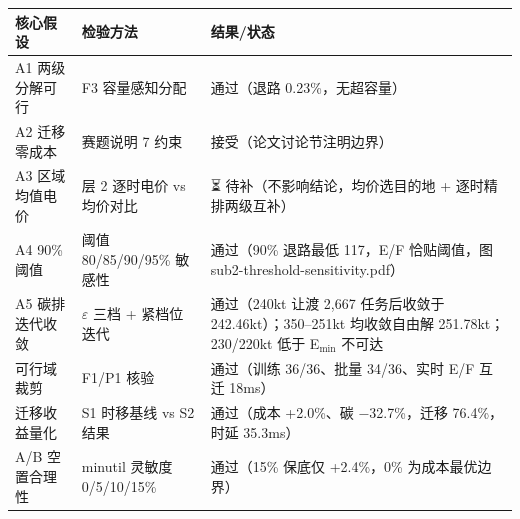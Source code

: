 \documentclass{internal-report}
\begin{document}
\begin{center}
\footnotesize
\begin{tabular}{p{3.6cm}p{4.6cm}p{5.4cm}}
\toprule
核心假设 & 检验方法 & 结果/状态 \\
\midrule
A1 两级分解可行 & F3 容量感知分配 & 通过（退路 0.23\%，无超容量） \\
A2 迁移零成本 & 赛题说明 7 约束 & 接受（论文讨论节注明边界） \\
A3 区域均值电价 & 层 2 逐时电价 vs 均价对比 & ⏳ 待补（不影响结论，均价选目的地 + 逐时精排两级互补） \\
A4 90\% 阈值 & 阈值 80/85/90/95\% 敏感性 & 通过（90\% 退路最低 117，E/F 恰贴阈值，图 sub2-threshold-sensitivity.pdf） \\
A5 碳排迭代收敛 & $\varepsilon$ 三档 + 紧档位迭代 & 通过（240kt 让渡 2{,}667 任务后收敛于 242.46kt）；350--251kt 均收敛自由解 251.78kt；230/220kt 低于 E$_{\text{min}}$ 不可达 \\
可行域裁剪 & F1/P1 核验 & 通过（训练 36/36、批量 34/36、实时 E/F 互迁 18ms） \\
迁移收益量化 & S1 时移基线 vs S2 结果 & 通过（成本 +2.0\%、碳 −32.7\%，迁移 76.4\%，时延 35.3ms） \\
A/B 空置合理性 & minutil 灵敏度 0/5/10/15\% & 通过（15\% 保底仅 +2.4\%，0\% 为成本最优边界） \\
\bottomrule
\end{tabular}
\end{center}
\end{document}
